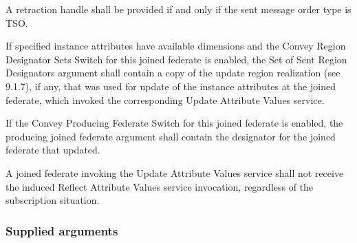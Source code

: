 \begin{compactstdpage}
    A retraction handle shall be provided if and only if the sent message order type is TSO.


    If specified instance attributes have available dimensions and the Convey Region Designator Sets Switch for this joined federate is enabled, the Set of Sent Region Designators argument shall contain a copy of the update region realization (see 9.1.7), if any, that was used for update of the instance attributes at the joined federate, which invoked the corresponding Update Attribute Values service.


    If the Convey Producing Federate Switch for this joined federate is enabled, the producing joined federate argument shall contain the designator for the joined federate that updated.


    A joined federate invoking the Update Attribute Values service shall not receive the induced Reflect Attribute Values \rtiinitiated{} service invocation, regardless of the subscription situation.

    \subsubsection{Supplied arguments}



\end{compactstdpage}

\clearpage

